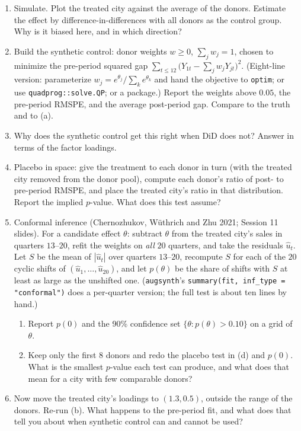 \documentclass[11pt]{article}
\begin{document}
\begin{enumerate}[label=(\alph*)]
\item Simulate. Plot the treated city against the average of the donors. Estimate the effect by
difference-in-differences with all donors as the control group. Why is it biased here, and in which
direction?
\item Build the synthetic control: donor weights $w \ge 0$, $\sum_{j} w_{j} = 1$, chosen to minimize
the pre-period squared gap $\sum_{t \le 12}\big(Y_{1t} - \sum_{j} w_{j}Y_{jt}\big)^{2}$. (Eight-line
version: parameterize $w_{j} = e^{\theta_{j}}/\sum_{k} e^{\theta_{k}}$ and hand the objective to
\texttt{optim}; or use \texttt{quadprog::solve.QP}; or a package.) Report the weights above $0.05$,
the pre-period RMSPE, and the average post-period gap. Compare to the truth and to (a).
\item Why does the synthetic control get this right when DiD does not? Answer in terms of the factor
loadings.
\item Placebo in space: give the treatment to each donor in turn (with the treated city removed from
the donor pool), compute each donor's ratio of post- to pre-period RMSPE, and place the treated
city's ratio in that distribution. Report the implied $p$-value. What does this test assume?
\item Conformal inference (Chernozhukov, W\"uthrich and Zhu 2021; Session 11 slides). For a candidate
effect $\theta$: subtract $\theta$ from the treated city's sales in quarters $13$--$20$, refit the
weights on \emph{all} $20$ quarters, and take the residuals $\hat u_{t}$. Let $S$ be the mean of
$|\hat u_{t}|$ over quarters $13$--$20$, recompute $S$ for each of the $20$ cyclic shifts of
$(\hat u_{1}, \ldots, \hat u_{20})$, and let $p(\theta)$ be the share of shifts with $S$ at least as large
as the unshifted one. (\texttt{augsynth}'s \texttt{summary(fit, inf\_type = "conformal")} does a
per-quarter version; the full test is about ten lines by hand.)
\begin{enumerate}[label=(\roman*)]
\item Report $p(0)$ and the 90\% confidence set $\{\theta : p(\theta) > 0.10\}$ on a grid of $\theta$.
\item Keep only the first $8$ donors and redo the placebo test in (d) and $p(0)$. What is the smallest
$p$-value each test can produce, and what does that mean for a city with few comparable donors?
\end{enumerate}
\item Now move the treated city's loadings to $(1.3, 0.5)$, outside the range of the donors. Re-run
(b). What happens to the pre-period fit, and what does that tell you about when synthetic control
can and cannot be used?
\end{enumerate}
\end{document}
